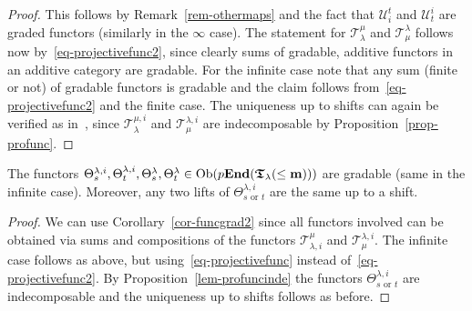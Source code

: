 \begin{proof}
This follows by Remark~\ref{rem-othermaps} 
and the fact that $\mathcal U_{i}^t$ and $\mathcal U^i_t$ are 
graded functors (similarly in the $\infty$ case). 
The statement for 
$\mathcal T_{\lambda}^{\mu}$ and $\mathcal T_{\mu}^{\lambda}$ follows now 
by~\eqref{eq-projectivefunc2}, since clearly sums of gradable, 
additive functors in an additive category are 
gradable. For the infinite case note that any sum (finite or not) 
of gradable functors is gradable and the claim 
follows from~\eqref{eq-projectivefunc2} 
and the finite case.
The uniqueness up to shifts can again be verified 
as in~\cite[Lemma 2.5.3]{bgs}, since 
$\mathcal T_{\lambda}^{\mu,i}$ and 
$\mathcal T_{\mu}^{\lambda,i}$ are 
indecomposable by Proposition~\ref{prop-profunc}. 
\end{proof}



\begin{cor}\label{cor-funcgrad1}
The functors 
$\Theta^{\lambda,i}_s,\Theta^{\lambda,i}_t,\Theta^{\lambda}_s,\Theta^{\lambda}_t\in\mathrm{Ob}(p\boldsymbol{\mathrm{End}}(\boldsymbol{\mathfrak{T}}_{\lambda}(\leq\boldsymbol{\mathrm{m}})))$ 
are 
gradable (same in the infinite case). 
Moreover, any two lifts of $\Theta^{\lambda,i}_{s\text{ or }t}$ are the same up to a 
shift.\makeqed
\end{cor}



\begin{proof}
We can use Corollary~\ref{cor-funcgrad2} 
since all 
functors involved can be obtained via sums and compositions of the functors 
$\mathcal T_{\lambda,i}^{\mu}$ and $\mathcal T^{\lambda,i}_{\mu}$. The infinite case follows as above, but using~\eqref{eq-projectivefunc} 
instead of~\eqref{eq-projectivefunc2}. 
By Proposition~\ref{lem-profuncinde} the functors $\Theta^{\lambda,i}_{s\text{ or }t}$ are 
indecomposable and the uniqueness up to shifts follows as before. 
\end{proof}


